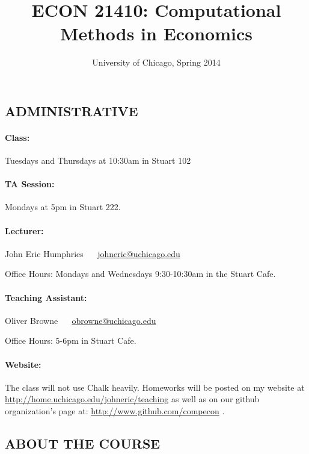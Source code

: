 \documentclass{scrartcl}
\title{ECON 21410: Computational Methods in Economics}
\subtitle{University of Chicago, Spring 2014}
\date{}
\begin{document}
\maketitle


\subsection*{ADMINISTRATIVE}

\paragraph{Class:} Tuesdays and Thursdays at 10:30am in Stuart 102

\paragraph{TA Session:} Mondays at 5pm in Stuart 222.

\paragraph{Lecturer:}  
John Eric Humphries ~~ \href{mailto:johneric@uchicago.edu}{johneric@uchicago.edu}

Office Hours: Mondays and Wednesdays 9:30-10:30am in the Stuart Cafe. 

\paragraph{Teaching Assistant:}
Oliver Browne ~~  \href{mailto:obrowne@uchicago.edu}{obrowne@uchicago.edu}

Office Hours: 5-6pm in Stuart Cafe.

\paragraph{Website:}

The class will not use Chalk heavily. Homeworks will be posted on my website at \href{http://home.uchicago.edu/johneric/teaching}{http://home.uchicago.edu/johneric/teaching} as well as on our github organization's page at: \href{http://www.github.com/compecon}{http://www.github.com/compecon} .

\subsection*{ABOUT THE COURSE}
\end{document}
